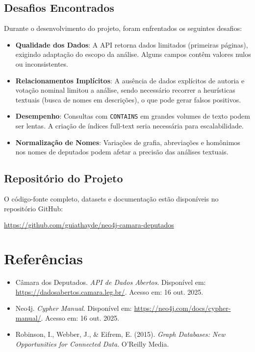 \documentclass[12pt,a4paper]{article}
\begin{document}
\subsection{Desafios Encontrados}

Durante o desenvolvimento do projeto, foram enfrentados os seguintes desafios:

\begin{itemize}
    \item \textbf{Qualidade dos Dados}: A API retorna dados limitados (primeiras páginas), exigindo adaptação do escopo da análise. Alguns campos contêm valores nulos ou inconsistentes.
    
    \item \textbf{Relacionamentos Implícitos}: A ausência de dados explícitos de autoria e votação nominal limitou a análise, sendo necessário recorrer a heurísticas textuais (busca de nomes em descrições), o que pode gerar falsos positivos.
    
    \item \textbf{Desempenho}: Consultas com \texttt{CONTAINS} em grandes volumes de texto podem ser lentas. A criação de índices full-text seria necessária para escalabilidade.
    
    \item \textbf{Normalização de Nomes}: Variações de grafia, abreviações e homônimos nos nomes de deputados podem afetar a precisão das análises textuais.
\end{itemize}

\subsection{Repositório do Projeto}

O código-fonte completo, datasets e documentação estão disponíveis no repositório GitHub:

\begin{center}
\url{https://github.com/guiathayde/neo4j-camara-deputados}
\end{center}

\section*{Referências}

\begin{itemize}
    \item Câmara dos Deputados. \textit{API de Dados Abertos}. Disponível em: \url{https://dadosabertos.camara.leg.br/}. Acesso em: 16 out. 2025.
    \item Neo4j. \textit{Cypher Manual}. Disponível em: \url{https://neo4j.com/docs/cypher-manual/}. Acesso em: 16 out. 2025.
    \item Robinson, I., Webber, J., \& Eifrem, E. (2015). \textit{Graph Databases: New Opportunities for Connected Data}. O'Reilly Media.
\end{itemize}
\end{document}
